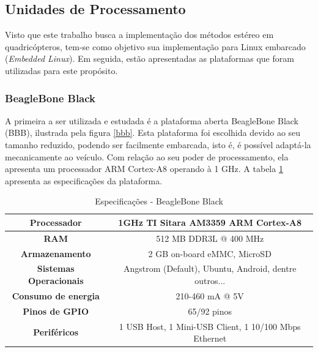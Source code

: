 \subsection{Unidades de Processamento}

Visto que este trabalho busca a implementação dos métodos estéreo em quadricópteros, tem-se como objetivo sua implementação para Linux embarcado (\textit{Embedded Linux}). Em seguida, estão apresentadas as plataformas que foram utilizadas para este propósito.


\subsubsection{BeagleBone Black}

A primeira a ser utilizada e estudada é a plataforma aberta BeagleBone Black (BBB), ilustrada pela figura \ref{bbb}. Esta plataforma foi escolhida devido ao seu tamanho reduzido, podendo ser facilmente embarcada, isto é, é possível adaptá-la mecanicamente ao veículo. Com relação ao seu poder de processamento, ela apresenta um processador ARM Cortex-A8 operando à 1 GHz. A tabela \ref{bbb_tab} apresenta as especificações da plataforma.

\begin{table}[]
\centering
\caption{Especificações - BeagleBone Black}
\label{bbb_tab}
\begin{tabular}{|c|c|}
\hline
\textbf{Processador}           & 1GHz TI Sitara AM3359 ARM Cortex-A8			\\	\hline
\textbf{RAM}                   & 512 MB DDR3L @ 400 MHz					\\	\hline
\textbf{Armazenamento}         & 2 GB on-board eMMC, MicroSD				\\	\hline
\textbf{Sistemas Operacionais} & Angstrom (Default), Ubuntu, Android, dentre outros...	\\	\hline
\textbf{Consumo de energia}    & 210-460 mA @ 5V					\\	\hline
\textbf{Pinos de GPIO}         & 65/92 pinos						\\	\hline
\textbf{Periféricos}           & 1 USB Host, 1 Mini-USB Client, 1 10/100 Mbps Ethernet  \\	\hline                              
\end{tabular}
\end{table}

